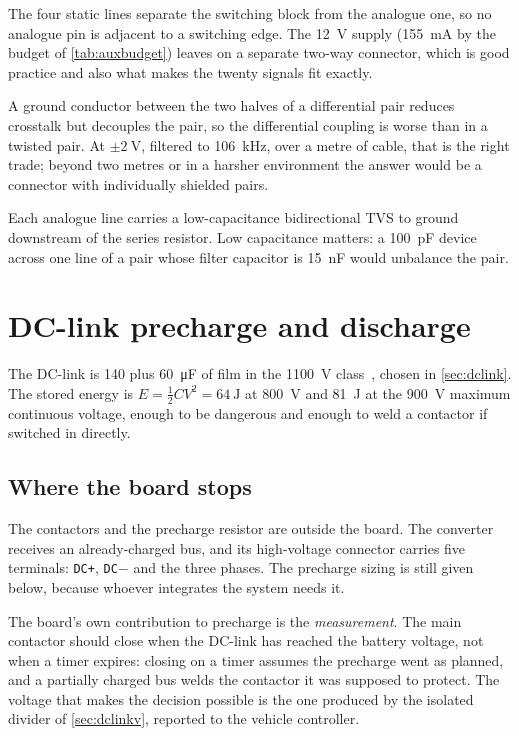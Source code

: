 The four static lines separate the switching block from the analogue one,
so no analogue pin is adjacent to a switching edge. The \SI{12}{\volt}
supply (\SI{155}{\milli\ampere} by the budget of
\cref{tab:auxbudget}) leaves on a separate two-way connector, which is good
practice and also what makes the twenty signals fit exactly.

A ground conductor between the two halves
of a differential pair reduces crosstalk but decouples the pair, so the
differential coupling is worse than in a twisted pair. At $\pm\SI{2}{\volt}$,
filtered to \SI{106}{\kilo\hertz}, over a metre of cable, that is the right
trade; beyond two metres or in a harsher environment the answer would be a
connector with individually shielded pairs.

Each analogue line carries a low-capacitance bidirectional TVS to ground
downstream of the series resistor. Low capacitance matters: a
\SI{100}{\pico\farad} device across one line of a pair whose filter
capacitor is \SI{15}{\nano\farad} would unbalance the pair.

\section{DC-link precharge and discharge}
\label{sec:dclinkmgmt}

The DC-link is \SI{140}{} plus \SI{60}{\micro\farad} of film in the
\SI{1100}{\volt} class~\cite{vishay_mkp1848}, chosen in \cref{sec:dclink}.
The stored energy is $E = \tfrac12 C V^2 = \SI{64}{\joule}$ at
\SI{800}{\volt} and \SI{81}{\joule} at the \SI{900}{\volt} maximum
continuous voltage, enough to be dangerous and enough to weld a contactor if
switched in directly.

\subsection{Where the board stops}
\label{sec:scope}

The contactors and the precharge resistor are outside the board.
The converter receives an already-charged bus, and its high-voltage
connector carries five terminals: \texttt{DC+}, \texttt{DC$-$} and the three
phases. The precharge sizing is still given below, because whoever
integrates the system needs it.

The board's own contribution to precharge is the \emph{measurement}. The
main contactor should close when the DC-link has reached the
battery voltage, not when a timer expires: closing on a timer assumes the
precharge went as planned, and a partially charged bus welds the contactor
it was supposed to protect. The voltage that makes the decision possible is
the one produced by the isolated divider of \cref{sec:dclinkv}, reported to
the vehicle controller.

